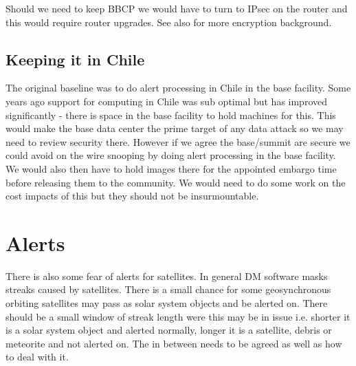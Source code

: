Should we need to keep BBCP we would have to turn to IPsec on the router and this would require router upgrades. See also  for more encryption background.



\subsection{Keeping it in Chile}\label{sec:chile}
The original baseline was to do alert processing in Chile in the base facility. Some years ago support for computing in Chile was sub optimal but has improved significantly - there is space in the base facility to hold machines for this.
This would make the base data center the prime target of any data  attack so we may need to review security there.
However if we agree the base/summit are secure we could avoid on the wire snooping by doing alert processing in the base facility. We would also then have to hold images there for the appointed embargo time  before releasing them to the community. We would need to do some work on the cost impacts of this but they should not be insurmountable.

\section{Alerts}
There is also some fear of alerts for satellites. In general DM software masks streaks caused by satellites. There is a small chance for some geosynchronous orbiting satellites may pass as solar system objects and be alerted on.
There should be a small window of streak length were this may be in issue i.e. shorter it is a solar system object and alerted normally, longer it is a satellite, debris or meteorite  and not alerted on. The in between needs to be agreed as well as how to deal with it.





